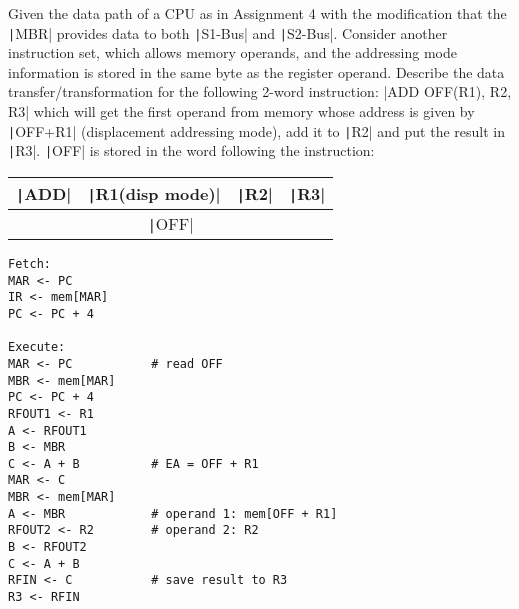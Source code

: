 \documentclass[answers]{exam}
\begin{document}
\begin{questions}
    \pagebreak
    \question Given the data path of a CPU as in Assignment 4 with the modification that the \texttt|MBR| provides data to both \texttt|S1-Bus| and \texttt|S2-Bus|. Consider another instruction set, which allows memory operands, and the addressing mode information is stored in the same byte as the register operand. Describe the data transfer/transformation for the following 2-word instruction:
    |ADD     OFF(R1), R2, R3|
    which will get the first operand from memory whose address is given by \texttt|OFF+R1| (displacement addressing mode), add it to \texttt|R2| and put the result in \texttt|R3|. \texttt|OFF| is stored in the word following the instruction:
    \begin{table}[htbp]
        \centering
        \begin{tabular}{|c|c|c|c|}
            \hline
            \texttt|ADD|
             & \texttt|R1(disp mode)|
             & \texttt|R2|
             & \texttt|R3|                     \\
            \hline\hline
            \multicolumn{4}{|c|}{\texttt|OFF|} \\ \hline
        \end{tabular}
    \end{table}

    \begin{solution}
        \begin{verbatim}
Fetch:
MAR <- PC
IR <- mem[MAR]
PC <- PC + 4

Execute:
MAR <- PC           # read OFF
MBR <- mem[MAR]
PC <- PC + 4
RFOUT1 <- R1
A <- RFOUT1
B <- MBR
C <- A + B          # EA = OFF + R1
MAR <- C
MBR <- mem[MAR]
A <- MBR            # operand 1: mem[OFF + R1]
RFOUT2 <- R2        # operand 2: R2
B <- RFOUT2
C <- A + B
RFIN <- C           # save result to R3
R3 <- RFIN
        \end{verbatim}
    \end{solution}

\end{questions}
\end{document}
